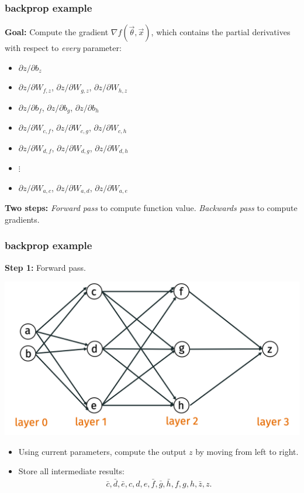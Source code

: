 \documentclass[handout,compress]{beamer}
\begin{document}
\begin{frame}
	\frametitle{backprop example}
	\textbf{Goal:} Compute the gradient $\nabla f(\vec{\theta},\vec{x})$, which contains the partial derivatives with respect to \emph{every} parameter:
	\begin{itemize}
		\item $\partial z / \partial b_z$
		\item $\partial z / \partial W_{f,z}$, $\partial z / \partial W_{g,z}$, $\partial z / \partial W_{h,z}$
		\item $\partial z / \partial b_f$, $\partial z / \partial  b_g$, $\partial z / \partial b_h$
		\item $\partial z / \partial W_{c,f}$, $\partial z / \partial W_{c,g}$, $\partial z / \partial W_{c,h}$
		\item $\partial z / \partial W_{d,f}$, $\partial z / \partial W_{d,g}$, $\partial z / \partial W_{d,h}$
		\item $\vdots$
		\item $\partial z / \partial W_{a,c}$, $\partial z / \partial W_{a,d}$, $\partial z / \partial W_{a,e}$
	\end{itemize}
\textbf{Two steps:} \emph{Forward pass} to compute function value. \emph{Backwards pass} to compute gradients. 
\end{frame}

\begin{frame}
	\frametitle{backprop example}
	\textbf{Step 1:} Forward pass. 
	\begin{center}
		\vspace{-.5em}
		\includegraphics[width=.6\textwidth]{backpro_example.png}
		\vspace{-1em}
	\end{center}
\begin{itemize}
	\item Using current parameters, compute the output $z$ by moving from left to right.
	\item Store all intermediate results: \begin{align*}\bar{c}, \bar{d}, \bar{e}, c,d,e, \bar{f}, \bar{g}, \bar{h}, f,g,h, \bar{z}, z. \end{align*}
\end{itemize}	
\end{frame}
\end{document}
